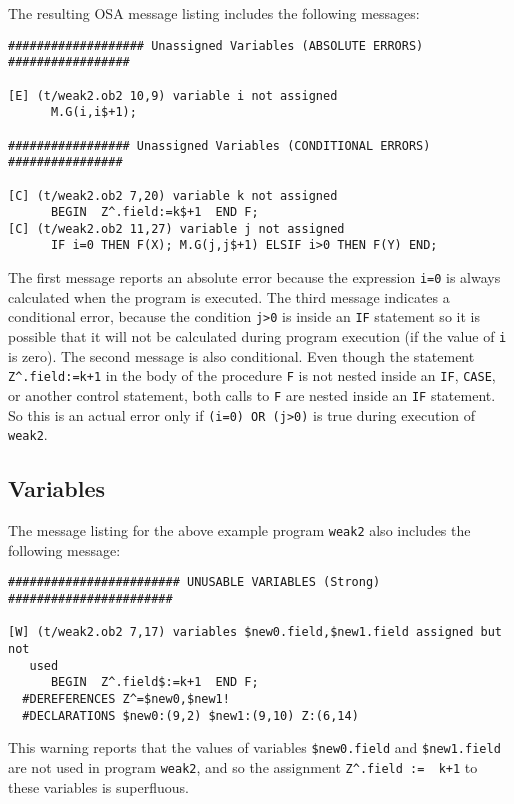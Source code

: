 The resulting OSA message listing includes the following messages: 

{\footnotesize
\begin{verbatim}
################### Unassigned Variables (ABSOLUTE ERRORS) #################

[E] (t/weak2.ob2 10,9) variable i not assigned
      M.G(i,i$+1);

################# Unassigned Variables (CONDITIONAL ERRORS) ################

[C] (t/weak2.ob2 7,20) variable k not assigned
      BEGIN  Z^.field:=k$+1  END F;
[C] (t/weak2.ob2 11,27) variable j not assigned
      IF i=0 THEN F(X); M.G(j,j$+1) ELSIF i>0 THEN F(Y) END;
\end{verbatim}
} %

The first message reports an absolute error because the
expression \verb'i=0' is always calculated when the program is executed.
The third message indicates a conditional error, because the condition 
\verb'j>0' is inside an \verb'IF' statement so it is possible that it will not
be calculated during program execution (if the value of \verb'i' is zero).
The second message is also conditional. Even though the statement 
\verb'Z^.field:=k+1' in the body of the procedure \verb'F' is not 
nested inside an \verb'IF', \verb'CASE', or another control statement,
both calls to \verb'F' are nested inside an \verb'IF' statement. 
So this is an actual error only if \verb'(i=0) OR (j>0)' is true
during execution of \verb'weak2'. 


\subsection{Variables}

The message listing for the above example program \verb'weak2' also
includes the following message: 

{\footnotesize
\begin{verbatim}
######################## UNUSABLE VARIABLES (Strong) #######################

[W] (t/weak2.ob2 7,17) variables $new0.field,$new1.field assigned but not
   used
      BEGIN  Z^.field$:=k+1  END F;
  #DEREFERENCES Z^=$new0,$new1!
  #DECLARATIONS $new0:(9,2) $new1:(9,10) Z:(6,14)
\end{verbatim}
} %

This warning reports that the values of variables \verb'$new0.field' and
\verb'$new1.field' are not used in program \verb'weak2', and so
the assignment \verb'Z^.field :=  k+1' to these variables is superfluous.

